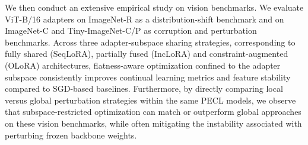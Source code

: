 \documentclass[10pt]{article} %
\begin{document}





We then conduct an extensive empirical study on vision benchmarks. We evaluate ViT-B/16 adapters on ImageNet-R as a distribution-shift benchmark and on ImageNet-C and Tiny-ImageNet-C/P as corruption and perturbation benchmarks. Across three adapter-subspace sharing strategies, corresponding to fully shared (SeqLoRA), partially fused (IncLoRA) and constraint-augmented (OLoRA) architectures, flatness-aware optimization confined to the adapter subspace consistently improves continual learning metrics and feature stability compared to SGD-based baselines. Furthermore, by directly comparing local versus global perturbation strategies within the same PECL models, we observe that subspace-restricted optimization can match or outperform global approaches on these vision benchmarks, while often mitigating the instability associated with perturbing frozen backbone weights.
\end{document}
